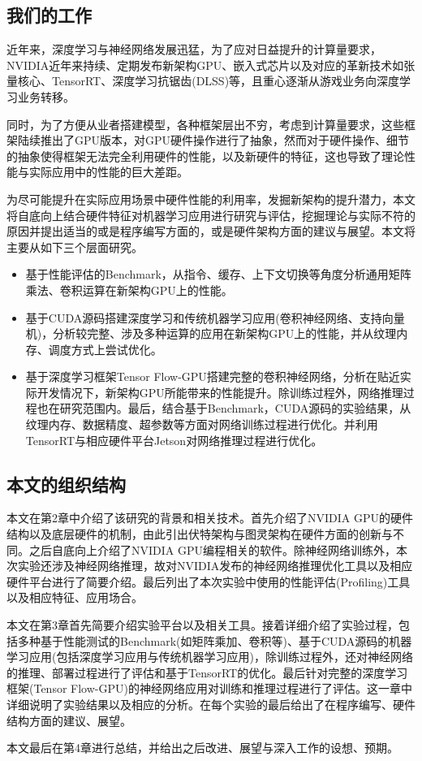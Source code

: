 \subsection{我们的工作}
\par 近年来，深度学习与神经网络发展迅猛，为了应对日益提升的计算量要求，NVIDIA近年来持续、定期发布新架构GPU、嵌入式芯片以及对应的革新技术如张量核心、TensorRT、深度学习抗锯齿(DLSS)等，且重心逐渐从游戏业务向深度学习业务转移。
\par 同时，为了方便从业者搭建模型，各种框架层出不穷，考虑到计算量要求，这些框架陆续推出了GPU版本，对GPU硬件操作进行了抽象，然而对于硬件操作、细节的抽象使得框架无法完全利用硬件的性能，以及新硬件的特征，这也导致了理论性能与实际应用中的性能的巨大差距。
\par 为尽可能提升在实际应用场景中硬件性能的利用率，发掘新架构的提升潜力，本文将自底向上结合硬件特征对机器学习应用进行研究与评估，挖掘理论与实际不符的原因并提出适当的或是程序编写方面的，或是硬件架构方面的建议与展望。本文将主要从如下三个层面研究。
\begin{itemize}
	\item 基于性能评估的Benchmark，从指令、缓存、上下文切换等角度分析通用矩阵乘法、卷积运算在新架构GPU上的性能。
	\item 基于CUDA源码搭建深度学习和传统机器学习应用(卷积神经网络、支持向量机)，分析较完整、涉及多种运算的应用在新架构GPU上的性能，并从纹理内存、调度方式上尝试优化。
	\item 基于深度学习框架Tensor Flow-GPU搭建完整的卷积神经网络，分析在贴近实际开发情况下，新架构GPU所能带来的性能提升。除训练过程外，网络推理过程也在研究范围内。最后，结合基于Benchmark，CUDA源码的实验结果，从纹理内存、数据精度、超参数等方面对网络训练过程进行优化。并利用TensorRT与相应硬件平台Jetson对网络推理过程进行优化。
\end{itemize}

\subsection{本文的组织结构}
\par 本文在第2章中介绍了该研究的背景和相关技术。首先介绍了NVIDIA GPU的硬件结构以及底层硬件的机制，由此引出伏特架构与图灵架构在硬件方面的创新与不同。之后自底向上介绍了NVIDIA GPU编程相关的软件。除神经网络训练外，本次实验还涉及神经网络推理，故对NVIDIA发布的神经网络推理优化工具以及相应硬件平台进行了简要介绍。最后列出了本次实验中使用的性能评估(Profiling)工具以及相应特征、应用场合。
\par 本文在第3章首先简要介绍实验平台以及相关工具。接着详细介绍了实验过程，包括多种基于性能测试的Benchmark(如矩阵乘加、卷积等)、基于CUDA源码的机器学习应用(包括深度学习应用与传统机器学习应用)，除训练过程外，还对神经网络的推理、部署过程进行了评估和基于TensorRT的优化。最后针对完整的深度学习框架(Tensor Flow-GPU)的神经网络应用对训练和推理过程进行了评估。这一章中详细说明了实验结果以及相应的分析。在每个实验的最后给出了在程序编写、硬件结构方面的建议、展望。
\par 本文最后在第4章进行总结，并给出之后改进、展望与深入工作的设想、预期。

